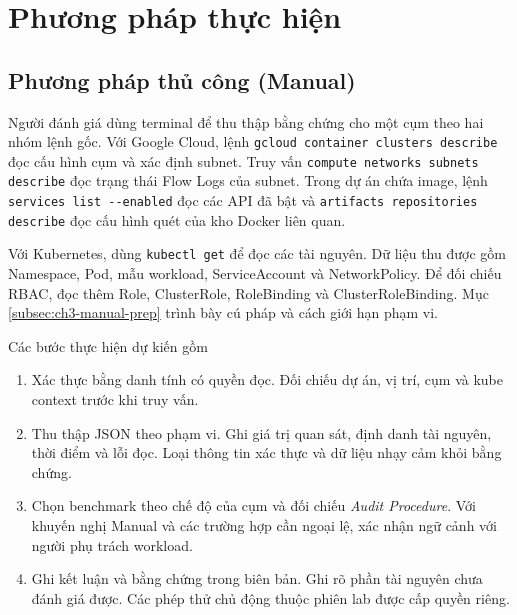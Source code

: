 \chapter{Phương pháp thực hiện}
\label{chap:methodology}

\section{Phương pháp thủ công (Manual)}
\label{sec:manual-method}

Người đánh giá dùng terminal để thu thập bằng chứng cho một cụm theo hai nhóm lệnh gốc. Với Google Cloud, lệnh \texttt{gcloud container clusters describe} đọc cấu hình cụm và xác định subnet. Truy vấn \texttt{compute networks subnets describe} đọc trạng thái Flow Logs của subnet. Trong dự án chứa image, lệnh \texttt{services list -{}-enabled} đọc các API đã bật và \texttt{artifacts repositories describe} đọc cấu hình quét của kho Docker liên quan.

Với Kubernetes, dùng \texttt{kubectl get} để đọc các tài nguyên. Dữ liệu thu được gồm Namespace, Pod, mẫu workload, ServiceAccount và NetworkPolicy. Để đối chiếu RBAC, đọc thêm Role, ClusterRole, RoleBinding và ClusterRoleBinding. Mục \ref{subsec:ch3-manual-prep} trình bày cú pháp và cách giới hạn phạm vi.

\begin{center}
  \captionsetup{hypcap=false}
  
  \label{fig:manual-workflow}
\end{center}

Các bước thực hiện dự kiến gồm
\begin{enumerate}[leftmargin=1.0cm,itemsep=1pt,parsep=0pt]
  \item Xác thực bằng danh tính có quyền đọc. Đối chiếu dự án, vị trí, cụm và kube context trước khi truy vấn.
  \item Thu thập JSON theo phạm vi. Ghi giá trị quan sát, định danh tài nguyên, thời điểm và lỗi đọc. Loại thông tin xác thực và dữ liệu nhạy cảm khỏi bằng chứng.
  \item Chọn benchmark theo chế độ của cụm và đối chiếu \emph{Audit Procedure}. Với khuyến nghị Manual và các trường hợp cần ngoại lệ, xác nhận ngữ cảnh với người phụ trách workload.
  \item Ghi kết luận và bằng chứng trong biên bản. Ghi rõ phần tài nguyên chưa đánh giá được. Các phép thử chủ động thuộc phiên lab được cấp quyền riêng.
\end{enumerate}

